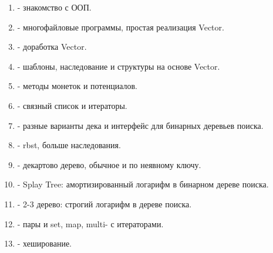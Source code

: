 \label{md2texREADME}
\begin{enumerate}
    \item \hyperref[md2tex1]{\color{cyan}{Урок 1}} - знакомство с ООП.
    \item \hyperref[md2tex2]{\color{cyan}{Урок 2}} - многофайловые программы, простая реализация Vector.
    \item \hyperref[md2tex3]{\color{cyan}{Урок 3}} - доработка Vector.
    \item \hyperref[md2tex4]{\color{cyan}{Урок 4}} - шаблоны, наследование и структуры на основе Vector.
    \item \hyperref[md2tex5]{\color{cyan}{Урок 5}} - методы монеток и потенциалов.
    \item \hyperref[md2tex6]{\color{cyan}{Урок 6}} - связный список и итераторы.
    \item \hyperref[md2tex7]{\color{cyan}{Урок 7}} - разные варианты дека и интерфейс для бинарных деревьев поиска.
    \item \hyperref[md2tex8]{\color{cyan}{Урок 8}} - rbst, больше наследования.
    \item \hyperref[md2tex9]{\color{cyan}{Урок 9}} - декартово дерево, обычное и по неявному ключу.
    \item \hyperref[md2tex10]{\color{cyan}{Урок 10}} - Splay Tree: амортизированный логарифм в бинарном дереве поиска.
    \item \hyperref[md2tex11]{\color{cyan}{Урок 11}} - 2-3 дерево: строгий логарифм в дереве поиска.
    \item \hyperref[md2tex12]{\color{cyan}{Урок 12}} - пары и set, map, multi- с итераторами.
    \item \hyperref[md2tex13]{\color{cyan}{Урок 13}} - хеширование.
\end{enumerate}
